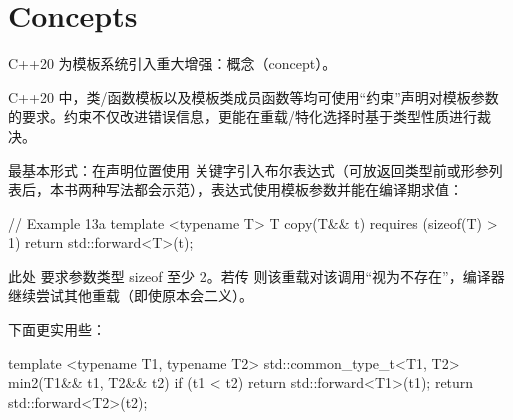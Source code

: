 \section{Concepts}

C++20 为模板系统引入重大增强：概念（concept）。

C++20 中，类/函数模板以及模板类成员函数等均可使用“约束”声明对模板参数的要求。约束不仅改进错误信息，更能在重载/特化选择时基于类型性质进行裁决。

最基本形式：在声明位置使用  关键字引入布尔表达式（可放返回类型前或形参列表后，本书两种写法都会示范），表达式使用模板参数并能在编译期求值：

\begin{code}
// Example 13a
template <typename T> T copy(T&& t)
  requires (sizeof(T) > 1)
{
  return std::forward<T>(t);
}
\end{code}

此处  要求参数类型 sizeof 至少 2。若传  则该重载对该调用“视为不存在”，编译器继续尝试其他重载（即使原本会二义）。

下面更实用些：

\begin{code}
template <typename T1, typename T2>
std::common_type_t<T1, T2> min2(T1&& t1, T2&& t2)
{
  if (t1 < t2) return std::forward<T1>(t1);
  return std::forward<T2>(t2);
}
\end{code}

